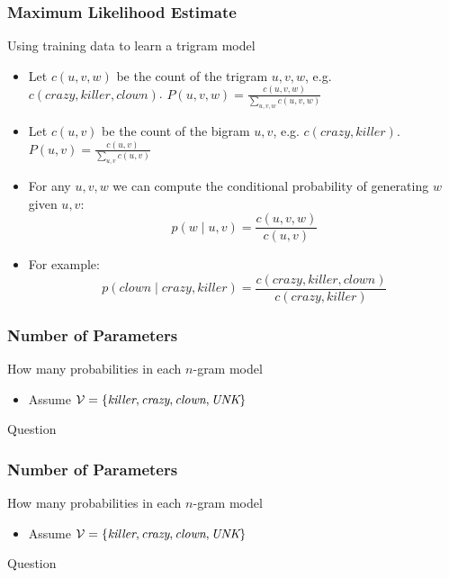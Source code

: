 \begin{frame}
\frametitle{Maximum Likelihood Estimate}
\begin{block}{Using training data to learn a trigram model}
\begin{itemize}[<+->]
\item Let $c(u,v,w)$ be the count of the trigram $u,v,w$, e.g. $c(crazy,killer,clown)$. $P(u,v,w) = \frac{c(u,v,w)}{\sum_{u,v,w} c(u,v,w)}$
\item Let $c(u,v)$ be the count of the bigram $u,v$, e.g. $c(crazy,killer)$. $P(u,v) = \frac{c(u,v)}{\sum_{u,v} c(u,v)}$
\item For any $u,v,w$ we can compute the conditional probability of generating $w$ given $u,v$:
\[ p(w \mid u,v) = \frac{c(u,v,w)}{c(u,v)} \]
\item For example:
\[ p(clown \mid crazy, killer) = \frac{c(crazy, killer, clown)}{c(crazy, killer)} \]
\end{itemize}

\end{block}
\end{frame}

\begin{frame}
\frametitle{Number of Parameters}
\begin{block}{How many probabilities in each $n$-gram model}
\begin{itemize}
\item Assume ${\cal V} = \{ \textit{killer}, \textit{crazy}, \textit{clown}, \textit{UNK} \}$
\end{itemize}
\end{block}
\pause
\begin{alertblock}{Question}
\end{alertblock}
\end{frame}

\begin{frame}
\frametitle{Number of Parameters}
\begin{block}{How many probabilities in each $n$-gram model}
\begin{itemize}
\item Assume ${\cal V} = \{ \textit{killer}, \textit{crazy}, \textit{clown}, \textit{UNK} \}$
\end{itemize}
\end{block}
\pause
\begin{alertblock}{Question}
\end{alertblock}
\end{frame}

